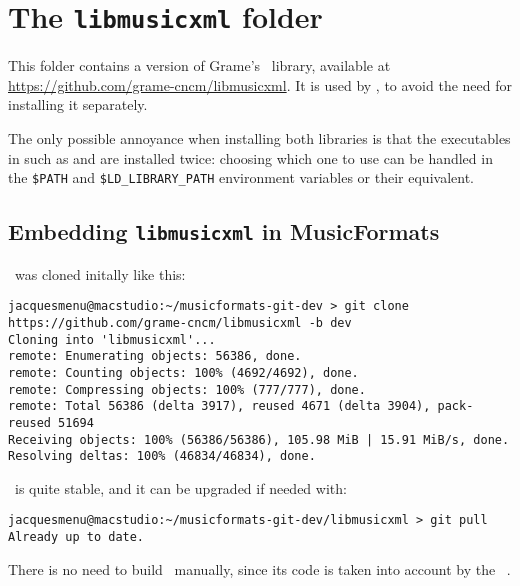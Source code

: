 \section{The {\tt libmusicxml} folder}

This folder contains a version of Grame's \libmusicxml\ library, available at \url{https://github.com/grame-cncm/libmusicxml}. It is used by \mf, to avoid the need for installing it separately.

The only possible annoyance when installing both libraries is that the executables in  such as  and  are installed twice: choosing which one to use can be handled in the {\tt \$\textbraceleft PATH\textbraceright} and {\tt \$\textbraceleft LD_LIBRARY_PATH\textbraceright} environment variables or their equivalent.


\subsection{Embedding {\tt libmusicxml} in MusicFormats}

\libmusicxml\ was cloned initally like this:
 \begin{lstlisting}[language=Terminal]
jacquesmenu@macstudio:~/musicformats-git-dev > git clone https://github.com/grame-cncm/libmusicxml -b dev
Cloning into 'libmusicxml'...
remote: Enumerating objects: 56386, done.
remote: Counting objects: 100% (4692/4692), done.
remote: Compressing objects: 100% (777/777), done.
remote: Total 56386 (delta 3917), reused 4671 (delta 3904), pack-reused 51694
Receiving objects: 100% (56386/56386), 105.98 MiB | 15.91 MiB/s, done.
Resolving deltas: 100% (46834/46834), done.
\end{lstlisting}

 \libmusicxml\ is quite stable, and it can be upgraded if needed with:
 \begin{lstlisting}[language=Terminal]
jacquesmenu@macstudio:~/musicformats-git-dev/libmusicxml > git pull
Already up to date.
\end{lstlisting}

There is no need to build \libmusicxml\ manually, since its code is taken into account by the \mf\ \Makefile.


